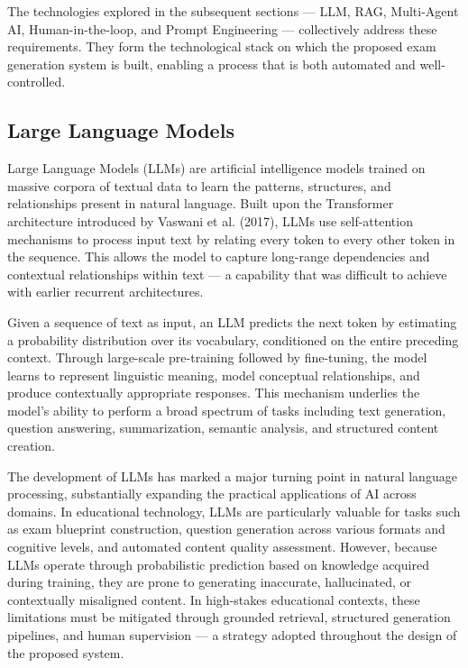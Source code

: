\documentclass[12pt,a4paper]{article}
\begin{document}
The technologies explored in the subsequent sections — LLM, RAG, Multi-Agent AI, Human-in-the-loop, and Prompt Engineering — collectively address these requirements. They form the technological stack on which the proposed exam generation system is built, enabling a process that is both automated and well-controlled.

\subsection{Large Language Models}

Large Language Models (LLMs) are artificial intelligence models trained on massive corpora of textual data to learn the patterns, structures, and relationships present in natural language. Built upon the Transformer architecture introduced by Vaswani et al. (2017), LLMs use self-attention mechanisms to process input text by relating every token to every other token in the sequence. This allows the model to capture long-range dependencies and contextual relationships within text — a capability that was difficult to achieve with earlier recurrent architectures.

Given a sequence of text as input, an LLM predicts the next token by estimating a probability distribution over its vocabulary, conditioned on the entire preceding context. Through large-scale pre-training followed by fine-tuning, the model learns to represent linguistic meaning, model conceptual relationships, and produce contextually appropriate responses. This mechanism underlies the model's ability to perform a broad spectrum of tasks including text generation, question answering, summarization, semantic analysis, and structured content creation.

The development of LLMs has marked a major turning point in natural language processing, substantially expanding the practical applications of AI across domains. In educational technology, LLMs are particularly valuable for tasks such as exam blueprint construction, question generation across various formats and cognitive levels, and automated content quality assessment. However, because LLMs operate through probabilistic prediction based on knowledge acquired during training, they are prone to generating inaccurate, hallucinated, or contextually misaligned content. In high-stakes educational contexts, these limitations must be mitigated through grounded retrieval, structured generation pipelines, and human supervision — a strategy adopted throughout the design of the proposed system.
\end{document}
